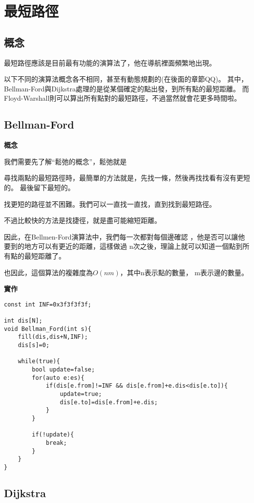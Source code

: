 \section{最短路徑}
    \subsection{概念}
    最短路徑應該是目前最有功能的演算法了，他在導航裡面頻繁地出現。

    以下不同的演算法概念各不相同，甚至有動態規劃的(在後面的章節QQ)。
    其中，Bellman-Ford與Dijkstra處理的是從某個確定的點出發，到所有點的最短距離。
    而Floyd-Warshall則可以算出所有點對的最短路徑，不過當然就會花更多時間啦。

    \subsection{Bellman-Ford}

    \textbf{概念}

    我們需要先了解``鬆弛的概念''，鬆弛就是

    尋找兩點的最短路徑時，最簡單的方法就是，先找一條，然後再找找看有沒有更短的。
    最後留下最短的。

    找更短的路徑並不困難。我們可以一直找一直找，直到找到最短路徑。

    不過比較快的方法是找捷徑，就是盡可能縮短距離。

    因此，在Bellmen-Ford演算法中，我們每一次都對每個邊確認
    ，他是否可以讓他要到的地方可以有更近的距離，這樣做過
    n次之後，理論上就可以知道一個點到所有點的最短距離了。

    也因此，這個算法的複雜度為$O(nm)$，其中n表示點的數量，
    m表示邊的數量。

    \textbf{實作}

\begin{lstlisting}[caption=Bellmen-Ford 算法]
const int INF=0x3f3f3f3f;

int dis[N];
void Bellman_Ford(int s){
    fill(dis,dis+N,INF);
    dis[s]=0;
    
    while(true){
        bool update=false;
        for(auto e:es){
            if(dis[e.from]!=INF && dis[e.from]+e.dis<dis[e.to]){
                update=true;
                dis[e.to]=dis[e.from]+e.dis;
            }
        }
        
        if(!update){
            break;
        }
    }
}    
\end{lstlisting}

    \subsection{Dijkstra}

